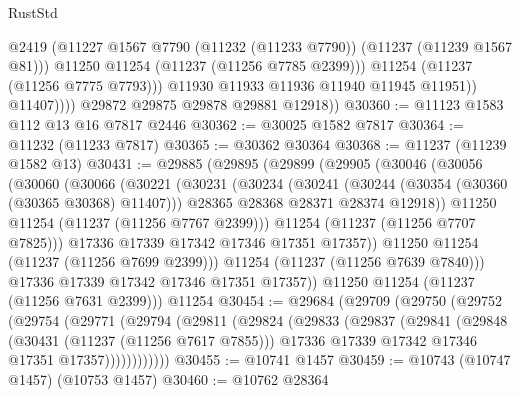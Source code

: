 \begin{lexlean}{RustStd}
\begin{coremodule}
                        @2419
                        (@11227 @1567 @7790 (@11232 (@11233 @7790)) (@11237 (@11239 @1567 @81)))
                        @11250
                        @11254
                        (@11237 (@11256 @7785 @2399)))
                      @11254
                      (@11237 (@11256 @7775 @7793)))
                    @11930
                    @11933
                    @11936
                    @11940
                    @11945
                    @11951))
                @11407))))
        @29872
        @29875
        @29878
        @29881
        @12918))
@30360 := @11123 @1583 @112 @13 @16 @7817 @2446
@30362 := @30025 @1582 @7817
@30364 := @11232 (@11233 @7817)
@30365 := @30362 @30364
@30368 := @11237 (@11239 @1582 @13)
@30431 := @29885
    (@29895
      (@29899
        (@29905
          (@30046
            (@30056
              (@30060
                (@30066
                  (@30221
                    (@30231
                      (@30234
                        (@30241
                          (@30244 (@30354 (@30360 (@30365 @30368) @11407)))
                          @28365
                          @28368
                          @28371
                          @28374
                          @12918))
                      @11250
                      @11254
                      (@11237 (@11256 @7767 @2399)))
                    @11254
                    (@11237 (@11256 @7707 @7825)))
                  @17336
                  @17339
                  @17342
                  @17346
                  @17351
                  @17357))
              @11250
              @11254
              (@11237 (@11256 @7699 @2399)))
            @11254
            (@11237 (@11256 @7639 @7840)))
          @17336
          @17339
          @17342
          @17346
          @17351
          @17357))
      @11250
      @11254
      (@11237 (@11256 @7631 @2399)))
    @11254
@30454 := @29684
    (@29709
      (@29750
        (@29752
          (@29754
            (@29771
              (@29794
                (@29811
                  (@29824
                    (@29833
                      (@29837
                        (@29841
                          (@29848
                            (@30431 (@11237 (@11256 @7617 @7855)))
                            @17336
                            @17339
                            @17342
                            @17346
                            @17351
                            @17357))))))))))))
@30455 := @10741 @1457
@30459 := @10743 (@10747 @1457) (@10753 @1457)
@30460 := @10762 @28364

\end{coremodule}
\end{lexlean}
